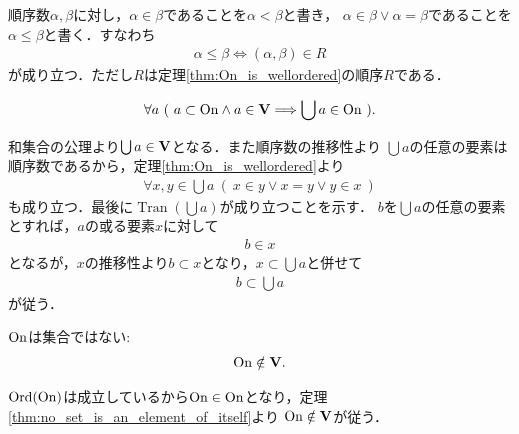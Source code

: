 	順序数$\alpha,\beta$に対し，$\alpha \in \beta$であることを$\alpha < \beta$と書き，
	$\alpha \in \beta \vee \alpha = \beta$であることを$\alpha \leq \beta$と書く．すなわち
	\begin{align}
		\alpha \leq \beta \Longleftrightarrow (\alpha,\beta) \in R
	\end{align}
	が成り立つ．ただし$R$は定理\ref{thm:On_is_wellordered}の順序$R$である．
	
	\begin{screen}
		\begin{thm}
			\begin{align}
				\forall a\ 
				(\ a \subset \ON \wedge a \in \Univ \Longrightarrow \bigcup a \in \ON\ ).
			\end{align}
		\end{thm}
	\end{screen}
	
	\begin{prf}
		和集合の公理より$\bigcup a \in \mathbf{V}$となる．また順序数の推移性より
		$\bigcup a$の任意の要素は順序数であるから，定理\ref{thm:On_is_wellordered}より
		\begin{align}
			\forall x,y \in \bigcup a\ (\ x \in y \vee x = y \vee y \in x\ )
		\end{align}
		も成り立つ．最後に$\operatorname{Tran}(\bigcup a)$が成り立つことを示す．
		$b$を$\bigcup a$の任意の要素とすれば，$a$の或る要素$x$に対して
		\begin{align}
			b \in x
		\end{align}
		となるが，$x$の推移性より$b \subset x$となり，$x \subset \bigcup a$と併せて
		\begin{align}
			b \subset \bigcup a
		\end{align}
		が従う．
		\QED
	\end{prf}
	
	\begin{screen}
		\begin{thm}
			$\mathrm{On}$は集合ではない:
			\begin{align}
				\mathrm{On} \notin \mathbf{V}.
			\end{align}
		\end{thm}
	\end{screen}
	
	\begin{prf}
		$\operatorname*{Ord}(\mathrm{On})$は成立しているから$\mathrm{On} \in \mathrm{On}$となり，定理\ref{thm:no_set_is_an_element_of_itself}より
		$\mathrm{On} \notin \mathbf{V}$が従う．
		\QED
	\end{prf}
	
